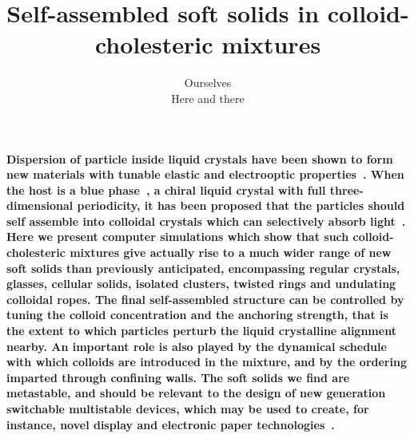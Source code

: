 \documentclass[12pt]{article}
\begin{document}
\title{Self-assembled soft solids in colloid-cholesteric mixtures}
\author{Ourselves \\ {\small Here and there}}
\date{}

\maketitle

{\bf Dispersion of particle inside liquid crystals have been shown to form new materials with tunable elastic and electrooptic properties~\cite{stark}. When the host is a blue phase~\cite{mermin}, a chiral liquid crystal with full three-dimensional periodicity, it has been proposed that the particles should self assemble into colloidal crystals which can selectively absorb light~\cite{miha,lavrentovich}. 
Here we present computer simulations which show that such colloid-cholesteric mixtures give actually rise to a much wider range of new soft solids than previously anticipated, encompassing regular crystals, glasses, cellular solids, isolated clusters, twisted rings and undulating colloidal ropes. The final self-assembled structure can be controlled by tuning the colloid concentration and the anchoring strength, that is the extent to which particles perturb the liquid crystalline alignment nearby. An important role is also played by the dynamical schedule with which colloids are introduced in the mixture, and by the ordering imparted through confining walls. The soft solids we find are metastable, and should be relevant to the design of new generation switchable multistable devices, which may be used to create, for instance, novel display and electronic paper technologies~\cite{epaper}.}

\end{document}
